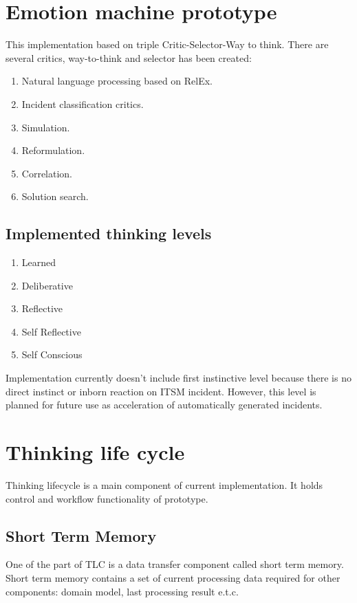 \documentclass{llncs}
\begin{document}
\section{Emotion machine prototype}
This implementation based on triple Critic-Selector-Way to think. There are several critics, way-to-think and selector has been created:

\begin{enumerate}
 \item Natural language processing based on RelEx.
 \item Incident classification critics.
 \item Simulation.
 \item Reformulation.
 \item Correlation.
 \item Solution search.
\end{enumerate}

\subsection{Implemented thinking levels}

\begin{enumerate}
 \item Learned
 \item Deliberative
 \item Reflective
 \item Self Reflective
 \item Self Conscious
\end{enumerate}

Implementation currently doesn’t include first instinctive level because there is no direct instinct or inborn reaction on ITSM incident. However, this level is planned for future use as acceleration of automatically generated incidents.

\section{Thinking life cycle}

Thinking lifecycle is a main component of current implementation. It holds control and workflow functionality of prototype. 

\subsection{Short Term Memory}
One of the part of TLC is a data transfer component called short term memory. Short term memory contains a set of current processing data required for other components: domain model, last processing result e.t.c.
\end{document}
